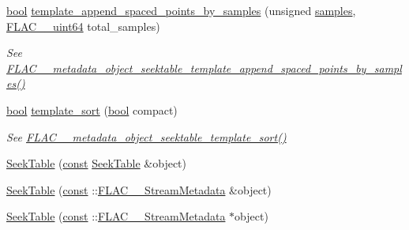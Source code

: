 \begin{DoxyCompactItemize}
\hyperlink{mac_2config_2i386_2lib-src_2libsoxr_2soxr-config_8h_abb452686968e48b67397da5f97445f5b}{bool} \hyperlink{class_f_l_a_c_1_1_metadata_1_1_seek_table_ab5b672df3c57703c1db965ce12ca8f45}{template\+\_\+append\+\_\+spaced\+\_\+points\+\_\+by\+\_\+samples} (unsigned \hyperlink{test__w__saw8_8c_a54185623a5a093f671a73e5fba6197a1}{samples}, \hyperlink{ordinals_8h_aa78c8c70a3eb8a58af7436f278acde8e}{F\+L\+A\+C\+\_\+\+\_\+uint64} total\+\_\+samples)
\begin{DoxyCompactList}\small\item\em See \hyperlink{group__flac__metadata__object_gabf797b64b96808cabf1d995573680fe9}{F\+L\+A\+C\+\_\+\+\_\+metadata\+\_\+object\+\_\+seektable\+\_\+template\+\_\+append\+\_\+spaced\+\_\+points\+\_\+by\+\_\+samples()} \end{DoxyCompactList}\item 
\hyperlink{mac_2config_2i386_2lib-src_2libsoxr_2soxr-config_8h_abb452686968e48b67397da5f97445f5b}{bool} \hyperlink{class_f_l_a_c_1_1_metadata_1_1_seek_table_a09cc5c101fc9c26655de9ec91dcb502f}{template\+\_\+sort} (\hyperlink{mac_2config_2i386_2lib-src_2libsoxr_2soxr-config_8h_abb452686968e48b67397da5f97445f5b}{bool} compact)
\begin{DoxyCompactList}\small\item\em See \hyperlink{group__flac__metadata__object_gaee6a1f08321b56a3fa65af94dd7830cd}{F\+L\+A\+C\+\_\+\+\_\+metadata\+\_\+object\+\_\+seektable\+\_\+template\+\_\+sort()} \end{DoxyCompactList}\end{DoxyCompactItemize}
{\bf }\par
\begin{DoxyCompactItemize}
\item 
\hyperlink{class_f_l_a_c_1_1_metadata_1_1_seek_table_a7f93d054937829a85108cd423a56299f}{Seek\+Table} (\hyperlink{getopt1_8c_a2c212835823e3c54a8ab6d95c652660e}{const} \hyperlink{class_f_l_a_c_1_1_metadata_1_1_seek_table}{Seek\+Table} \&object)
\item 
\hyperlink{class_f_l_a_c_1_1_metadata_1_1_seek_table_a9a39c8eef9d57d84008eb68474c6fa6f}{Seek\+Table} (\hyperlink{getopt1_8c_a2c212835823e3c54a8ab6d95c652660e}{const} \+::\hyperlink{struct_f_l_a_c_____stream_metadata}{F\+L\+A\+C\+\_\+\+\_\+\+Stream\+Metadata} \&object)
\item 
\hyperlink{class_f_l_a_c_1_1_metadata_1_1_seek_table_af544e2467d49d7b8610bf4ad8e14969b}{Seek\+Table} (\hyperlink{getopt1_8c_a2c212835823e3c54a8ab6d95c652660e}{const} \+::\hyperlink{struct_f_l_a_c_____stream_metadata}{F\+L\+A\+C\+\_\+\+\_\+\+Stream\+Metadata} $\ast$object)
\end{DoxyCompactItemize}

